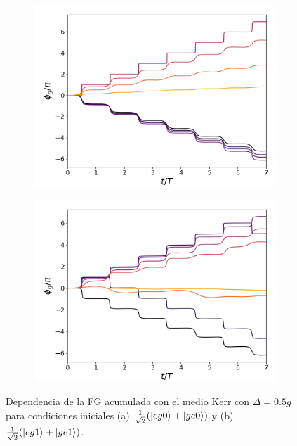 \begin{figure}[h]
    \centering
    \begin{subfigure}{0.49\textwidth}
        \includegraphics[width=\textwidth]{figuras/ch5/dependencia/eg0+/ker d=0.5g.png}
        \caption{}
        \label{fig5:dependencia kerr 2 eg0}
    \end{subfigure}
    \hfill
    \begin{subfigure}{0.49\textwidth}
        \includegraphics[width=\textwidth]{figuras/ch5/dependencia/eg1+/kerr d=0.5g.png}
        \caption{}
        \label{fig5:dependencia kerr 2 eg1}
    \end{subfigure}
    \caption{Dependencia de la FG acumulada con el medio Kerr con $\Delta=0.5g$ para condiciones iniciales (a) $\frac{1}{\sqrt{2}}(\ket{eg0}+\ket{ge0})$ y (b) $\frac{1}{\sqrt{2}}(\ket{eg1}+\ket{ge1})$.}
    \label{fig5:dependencia kerr 2}
\end{figure}


